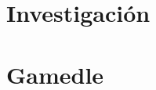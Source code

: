 \documentclass[10pt]{book}
\title{\TituloTT\bigskip}
\subtitle{Trabajo Terminal No. 2018-B029, Esquema de trabajo, Sem:2019-2}
\author{David Flores Casanova, Ricardo Naranjo Polit, Daniel Isai Ortega}
\date{Borrador del \today}
\begin{document}
    
    \frontmatter
        \maketitle
        \thispagestyle{empty}
    	\tableofcontents
    	\listoffigures		
    	
	\mainmatter
	    
	    
	    \part{Investigación}\label{part:investigacion}
	        
	        
	        
        \part{Gamedle}\label{part:modulos}
    	    
            
            
    	    
	        
    	    
    	    
    	    
    	    
    \backmatter
        
	    
        
\end{document}
